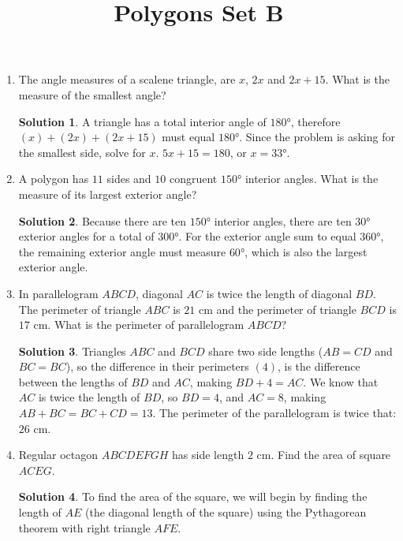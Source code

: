 \documentclass{article}
\title{Polygons Set B}
\author{}
\date{}
\theoremstyle{definition}
\newtheorem*{solution}{Solution}
\begin{document}
\maketitle

\begin{multicols}{2}
    \begin{enumerate}
        \item The angle measures of a scalene triangle, are $x$, $2x$ and $2x + 15$.
            What is the measure of the smallest angle?
            \begin{solution}
                A triangle has a total interior angle of $\ang{180}$, therefore $(x) + (2x) + (2x +15)$ must equal $\ang{180}$.
                Since the problem is asking for the smallest side, solve for $x$.
                $5x + 15 = 180$, or $x = \ang{33}$.
            \end{solution}
        \item A polygon has $11$ sides and $10$ congruent $\ang{150}$ interior angles.
            What is the measure of its largest exterior angle?
            \begin{solution}
                Because there are ten $\ang{150}$ interior angles, there are ten $\ang{30}$ exterior angles for a total of $\ang{300}$.
                For the exterior angle sum to equal $\ang{360}$, the remaining exterior angle must measure $\ang{60}$, which is also the largest exterior angle.
            \end{solution}
        \item In parallelogram $ABCD$, diagonal $AC$ is twice the length of diagonal $BD$.
            The perimeter of triangle $ABC$ is $21$ cm and the perimeter of triangle $BCD$ is $17$ cm.
            What is the perimeter of parallelogram $ABCD$?
            \begin{solution}
                Triangles $ABC$ and $BCD$ share two side lengths ($AB = CD$ and $BC = BC$), so the difference in their perimeters $(4)$, is the difference between the lengths of $BD$ and $AC$, making $BD + 4 = AC$.
                We know that $AC$ is twice the length of $BD$, so $BD = 4$, and $AC = 8$, making $AB + BC = BC + CD = 13$.
                The perimeter of the parallelogram is twice that: $26$ cm.
            \end{solution}
        \item Regular octagon $ABCDEFGH$ has side length $2$ cm.
            Find the area of square $ACEG$.
            \begin{solution}
                To find the area of the square, we will begin by finding the length of $AE$ (the diagonal length of the square) using the Pythagorean theorem with right triangle $AFE$.

\end{solution}
\end{enumerate}
\end{multicols}
\end{document}

